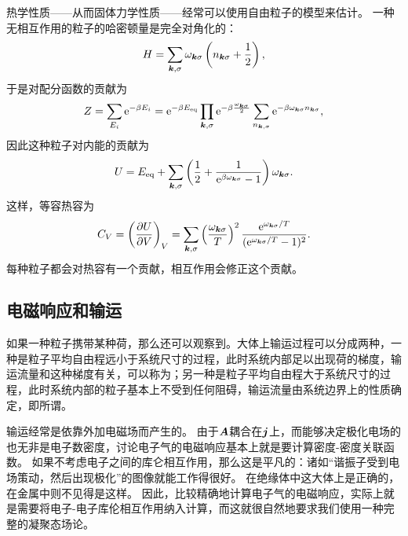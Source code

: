 热学性质——从而固体力学性质——经常可以使用自由粒子的模型来估计。
一种无相互作用的粒子的哈密顿量是完全对角化的：
\[
    H = \sum_{\vb*{k}, \sigma} \omega_{\vb*{k}\sigma} \left(n_{\vb*{k} \sigma} + \frac{1}{2}\right),
\]
于是对配分函数的贡献为
\begin{equation}
    Z = \sum_{E_i} \mathrm{e}^{- \beta E_i} = \mathrm{e}^{-\beta E_{\text{eq}}} \prod_{\vb*{k}, \sigma} \mathrm{e}^{- \beta \frac{\omega_{\vb*{k}\sigma}}{2}} \sum_{n_{\vb*{k}, \sigma}} \mathrm{e}^{-\beta \omega_{\vb*{k}\sigma} n_{\vb*{k} \sigma}},
\end{equation}
因此这种粒子对内能的贡献为
\begin{equation}
    U = E_{\text{eq}} + \sum_{\vb*{k}, \sigma} \left( \frac{1}{2} + \frac{1}{\mathrm{e}^{\beta \omega_{\vb*{k}\sigma}} - 1} \right) \omega_{\vb*{k}\sigma}.
\end{equation}
这样，等容热容为
\begin{equation}
    C_V = \left(\pdv{U}{V}\right)_V = \sum_{\vb*{k}, \sigma} \left(\frac{\omega_{\vb*{k}\sigma}}{T}\right)^2 \frac{\mathrm{e}^{\omega_{\vb*{k}\sigma} / T}}{(\mathrm{e}^{\omega_{\vb*{k}\sigma} / T} - 1)^2}.
\end{equation}
每种粒子都会对热容有一个贡献，相互作用会修正这个贡献。

\subsection{电磁响应和输运}

如果一种粒子携带某种荷，那么还可以观察到。大体上输运过程可以分成两种，一种是粒子平均自由程远小于系统尺寸的过程，此时系统内部足以出现荷的梯度，输运流量和这种梯度有关，可以称为；另一种是粒子平均自由程大于系统尺寸的过程，此时系统内部的粒子基本上不受到任何阻碍，输运流量由系统边界上的性质确定，即所谓。

输运经常是依靠外加电磁场而产生的。
由于$\vb*{A}$耦合在$\vb*{j}$上，而能够决定极化电场的也无非是电子数密度，讨论电子气的电磁响应基本上就是要计算密度-密度关联函数。
如果不考虑电子之间的库仑相互作用，那么这是平凡的：诸如“谐振子受到电场策动，然后出现极化”的图像就能工作得很好。
在绝缘体中这大体上是正确的，在金属中则不见得是这样。
因此，比较精确地计算电子气的电磁响应，实际上就是需要将电子-电子库伦相互作用纳入计算，而这就很自然地要求我们使用一种完整的凝聚态场论。